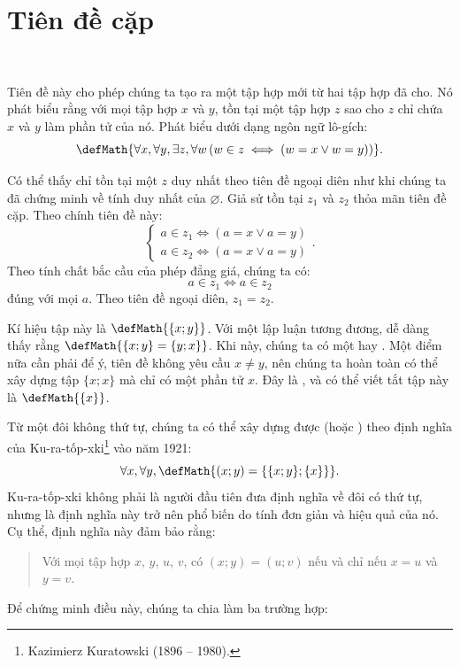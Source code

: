 \section{Tiên đề cặp}

\ 

Tiên đề này cho phép chúng ta tạo ra một tập hợp mới từ hai tập hợp đã cho. Nó phát biểu rằng với mọi tập hợp $x$ và $y$, tồn tại một tập hợp $z$ sao cho $z$ chỉ chứa $x$ và $y$ làm phần tử của nó. Phát biểu dưới dạng ngôn ngữ lô-gích:
\begin{equation*}
    \defMath{\forall x, \forall y, \exists z, \forall w \left( w \in z \iff (w = x \lor w = y) \right)}.
\end{equation*}

Có thể thấy chỉ tồn tại một $z$ duy nhất theo tiên đề ngoại diên như khi chúng ta đã chứng minh về tính duy nhất của $\varnothing$. Giả sử tồn tại $z_1$ và $z_2$ thỏa mãn tiên đề cặp. Theo chính tiên đề này:
\begin{equation*}
    \begin{cases}
        a \in z_1 \iff (a = x \lor a = y) \\
        a \in z_2 \iff (a = x \lor a = y)
    \end{cases}.
\end{equation*}
Theo tính chất bắc cầu của phép đẳng giá, chúng ta có:
$$
a \in z_1 \iff a \in z_2
$$
đúng với mọi $a$. Theo tiên đề ngoại diên, $z_1 = z_2$.

Kí hiệu tập này là $\defMath{\{x; y\}}$. Với một lập luận tương đương, dễ dàng thấy rằng $\defMath{\{x; y\} = \{y; x\}}$. Khi này, chúng ta có một  hay . Một điểm nữa cần phải để ý, tiên đề không yêu cầu $x \neq y$, nên chúng ta hoàn toàn có thể xây dựng tập $\{x; x\}$ mà chỉ có một phần tử $x$. Đây là , và có thể viết tắt tập này là $\defMath{\{x\}}$.

Từ một đôi không thứ tự, chúng ta có thể xây dựng được  (hoặc ) theo định nghĩa của Ku-ra-tốp-xki\footnote{Kazimierz Kuratowski (1896 -- 1980).} vào năm 1921: $$\forall x, \forall y,\defMath{(x; y) = \{\{x; y\}; \{x\}\}}.$$
Ku-ra-tốp-xki không phải là người đầu tiên đưa định nghĩa về đôi có thứ tự, nhưng là định nghĩa này trở nên phổ biến do tính đơn giản và hiệu quả của nó. Cụ thể, định nghĩa này đảm bảo rằng:
\begin{quotation}
    Với mọi tập hợp $x$, $y$, $u$, $v$, có $(x; y) = (u; v)$ nếu và chỉ nếu $x = u$ và $y = v$.
\end{quotation}
Để chứng minh điều này, chúng ta chia làm ba trường hợp:

